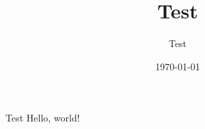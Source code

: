 \documentclass{beamer}
\title{Test}
\author{Test}
\date{\today}
\begin{document}
\frame{\titlepage}
\begin{frame}{Test}
Hello, world!
\end{frame}
\end{document}
